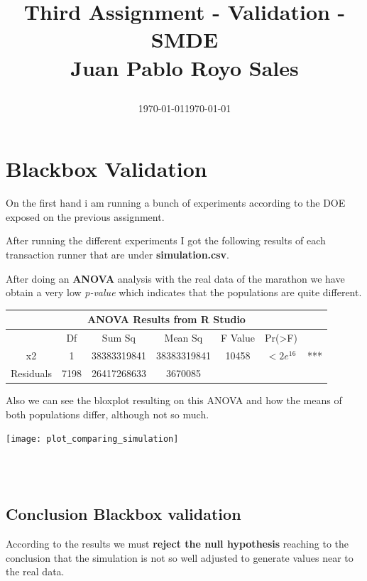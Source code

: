 \documentclass[12pt, a4paper]{article}
\title{
  Third Assignment - Validation - SMDE\\
  Juan Pablo Royo Sales\\
  \date\today\vspace{-2em}}
\date{\normalize\today}
\begin{document}
\maketitle

\section{Blackbox Validation}

On the first hand i am running a bunch of experiments according to the DOE
exposed on the previous assignment.

After running the different experiments I got the following results of each
transaction runner that are under \textbf{simulation.csv}.

After doing an \textbf{ANOVA} analysis with the real data of the marathon we
have obtain a very low \textit{p-value} which indicates that the populations are quite
different.

\begin{table}[h!]
  \begin{tabular}{ |c|c|c|c|c|c|c|  }
    \hline
    \multicolumn{7}{|c|}{ANOVA Results from R Studio} \\
    \hline
    & Df & Sum Sq & Mean Sq & F Value & Pr(>F) & \\
    \hline
    x2 & 1 & 38383319841 & 38383319841 & 10458 & $<2e^{16}$ & *** \\
    Residuals & 7198 & 26417268633 & 3670085 & & & \\
    \hline
  \end{tabular}
  \label{table:anova}
\end{table}

Also we can see the bloxplot resulting on this ANOVA and how the means of both
populations differ, although not so much.

\begin{minipage}[t]{\linewidth}
  \centering
  \texttt{[image: plot\_comparing\_simulation]}
\end{minipage}\\\\

\subsection{Conclusion Blackbox validation}
According to the results we must \textbf{reject the null hypothesis} reaching to
the conclusion that the simulation is not so well adjusted to generate values
near to the real data.
\end{document}
